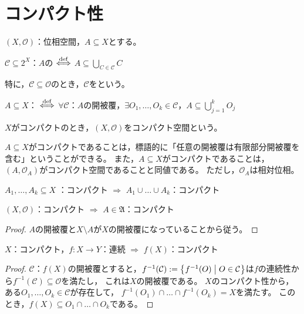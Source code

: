 \documentclass[uplatex]{jsarticle}
\begin{document}
\fi

\section{コンパクト性}
$(X, \mathcal{O})$：位相空間，$A \subseteq X$とする。

\begin{teigi}[被覆]
  $\mathcal{C} \subseteq 2^{X}$：$A$の $\overset{\mathrm{def}}{\Longleftrightarrow}$ ${\displaystyle A \subseteq \bigcup_{C \in \mathcal{C}} C}$

  特に，$\mathcal{C} \subseteq \mathcal{O}$のとき，$\mathcal{C}$をという。
\end{teigi}

\begin{teigi}[コンパクト]
   $A \subseteq X$： $\overset{\mathrm{def}}{\Longleftrightarrow}$ $\forall \mathcal{C}$：$A$の開被覆，$\exists O_{1}, \dots, O_{k} \in \mathcal{C}$，${\displaystyle A \subseteq \bigcup_{j=1}^{k} O_{j}}$

   $X$がコンパクトのとき，$(X, \mathcal{O})$をコンパクト空間という。
\end{teigi}

$A \subseteq X$がコンパクトであることは，標語的に「任意の開被覆は有限部分開被覆を含む」ということができる。
また，$A \subseteq X$がコンパクトであることは，$(A, \mathcal{O}_{A})$がコンパクト空間であることと同値である。
ただし，$\mathcal{O}_{A}$は相対位相。

\begin{hodai}
  $A_{1}, \dots, A_{k} \subseteq X$ ：コンパクト $\Longrightarrow$ $A_{1} \cup \dots \cup A_{k}$：コンパクト
\end{hodai}

\begin{hodai}
  $(X, \mathcal{O})$：コンパクト $\Longrightarrow$ $A \in \mathfrak{A}$：コンパクト
\end{hodai}

\begin{proof}
  $A$の開被覆と$X \setminus A$が$X$の開被覆になっていることから従う。
\end{proof}

\begin{hodai}
  $X$：コンパクト，$f \colon X \longrightarrow Y$：連続 $\Longrightarrow$ $f(X)$：コンパクト
\end{hodai}

\begin{proof}
  $\mathcal{C}$：$f(X)$の開被覆とすると，$f^{-1}(\mathcal{C}) := \Set{\hspace{-1.8pt} f^{-1} (O) | O \in \mathcal{C} \hspace{-1.8pt}}$は$f$の連続性から$f^{-1}(\mathcal{C}) \subseteq \mathcal{O}$を満たし，
  これは$X$の開被覆である。
  $X$のコンパクト性から，ある$O_{1}, \dots, O_{k} \in \mathcal{C}$が存在して，
  $f^{-1}(O_{1}) \cap \dots \cap f^{-1}(O_{k}) = X$を満たす。
  このとき，$f(X) \subseteq O_{1} \cap \dots \cap O_{k}$である。
\end{proof}
\end{document}
